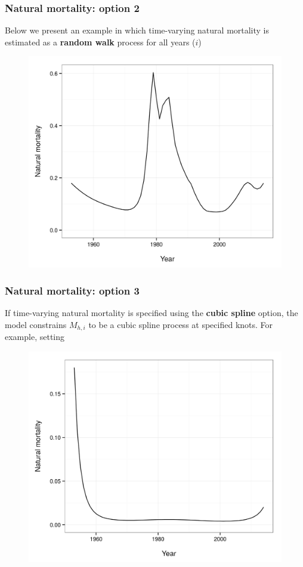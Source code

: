 \documentclass{beamer}
\begin{document}
\begin{frame}
\frametitle{Natural mortality: option 2}
Below we present an example in which time-varying natural mortality is estimated
as a {\bf random walk} process for all years ($i$)
\begin{figure}[!htbp]
  \centering
  \includegraphics[width=0.65\linewidth]{figure/M_t_walk.png}
\end{figure}
\end{frame}


\begin{frame}
\frametitle{Natural mortality: option 3}
If time-varying natural mortality is specified using the {\bf cubic spline}
option, the model constrains $M_{h,i}$ to be a cubic spline process at
specified knots. For example, setting
\begin{figure}[!htbp]
  \centering
  \includegraphics[width=0.65\linewidth]{figure/M_t_spline.png}
\end{figure}
\end{frame}

\end{document}

